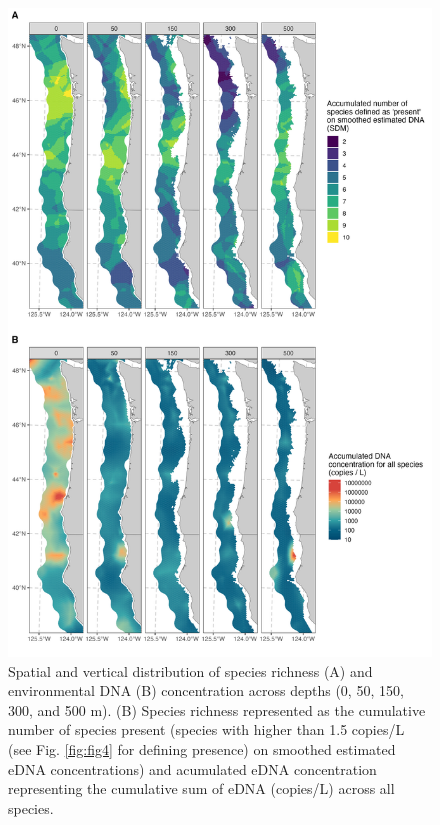 \documentclass{article}
\begin{document}
\begin{figure}[tbhp]  
\centering
\includegraphics[width=13cm]{plots/3_Figure_3.jpg}  
\caption{Spatial and vertical distribution of species richness (A) and environmental DNA (B) concentration across depths (0, 50, 150, 300, and 500 m). (B) Species richness represented as the cumulative number of species present (species with higher than 1.5 copies/L (see Fig. \ref{fig:fig4} for defining presence) on smoothed estimated eDNA concentrations) and acumulated eDNA concentration representing the cumulative sum of eDNA (copies/L) across all species.}
\label{fig:fig3}
\end{figure}
\end{document}
